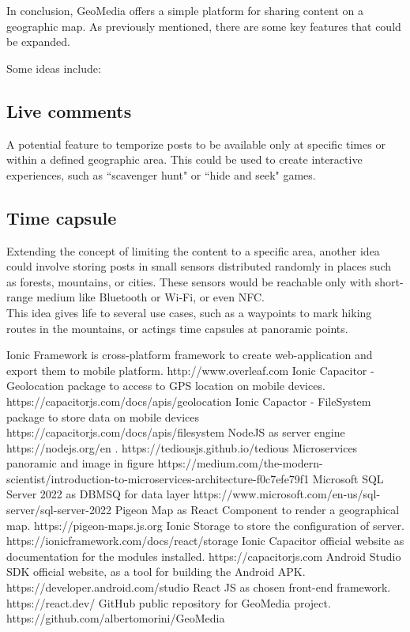 \documentclass[conference]{IEEEtran}
\begin{document}
In conclusion, GeoMedia offers a simple platform for sharing content on a geographic map. As previously mentioned, there are some key features that could be expanded.

Some ideas include:

\subsection{Live comments}
A potential feature to temporize posts to be available only at specific times or within a defined geographic area.
This could be used to create interactive experiences, such as ``scavenger hunt" or ``hide and seek" games.

\subsection{Time capsule}

Extending the concept of limiting the content to a specific area, another idea could involve storing posts in small sensors distributed randomly in places such as forests, mountains, or cities. 
These sensors would be reachable only with short-range medium like Bluetooth or Wi-Fi, or even NFC.
\\
This idea gives life to several use cases, such as a waypoints to mark hiking routes in the mountains, or actings time capsules at panoramic points.


\begin{thebibliography}{00}
 Ionic Framework is cross-platform framework to create web-application and export them to mobile platform. http://www.overleaf.com
 Ionic Capacitor - Geolocation package to access to GPS location on mobile devices. https://capacitorjs.com/docs/apis/geolocation
Ionic Capactor - FileSystem package to store data on mobile devices https://capacitorjs.com/docs/apis/filesystem
 NodeJS as server engine https://nodejs.org/en
. https://tediousjs.github.io/tedious
 Microservices panoramic and image in figure https://medium.com/the-modern-scientist/introduction-to-microservices-architecture-f0c7efe79f1
 Microsoft SQL Server 2022 as DBMSQ for data layer https://www.microsoft.com/en-us/sql-server/sql-server-2022
 Pigeon Map as React Component to render a geographical map. https://pigeon-maps.js.org
Ionic Storage to store the configuration of server. https://ionicframework.com/docs/react/storage
Ionic Capacitor official website as documentation for the modules installed. https://capacitorjs.com
Android Studio SDK official website, as a tool for building the Android APK. https://developer.android.com/studio
React JS as chosen front-end framework. https://react.dev/
GitHub public repository for GeoMedia project. https://github.com/albertomorini/GeoMedia
\end{thebibliography}

\vspace{12pt}
\end{document}
